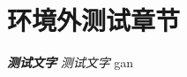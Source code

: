 \documentclass[color=blue]{textbook-cn}%
\begin{document}
\chapter{环境外测试章节}

\begin{Exercise}
	\lipsum[2]
\end{Exercise}

\begin{Thinking}
	\lipsum[2]
\end{Thinking}


\begin{Improve}
	\lipsum[2]
\end{Improve}



\begin{Definition}[定义名称]
	\lipsum[2]
\end{Definition}



{\ttfamily\bfseries\itshape 测试文字}
{\kaiti\itshape 测试文字}
{\kaiti gan}
\end{document}
